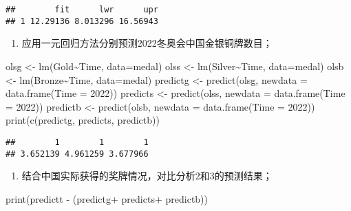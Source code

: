 \documentclass[
]{article}
\newenvironment{Shaded}{\begin{snugshade}}{\end{snugshade}}
\newcommand{\AttributeTok}[1]{\textcolor[rgb]{0.77,0.63,0.00}{#1}}
\newcommand{\DecValTok}[1]{\textcolor[rgb]{0.00,0.00,0.81}{#1}}
\newcommand{\FunctionTok}[1]{\textcolor[rgb]{0.00,0.00,0.00}{#1}}
\newcommand{\NormalTok}[1]{#1}
\newcommand{\OtherTok}[1]{\textcolor[rgb]{0.56,0.35,0.01}{#1}}
\newcommand{\SpecialCharTok}[1]{\textcolor[rgb]{0.00,0.00,0.00}{#1}}
\providecommand{\tightlist}{%
  \setlength{\itemsep}{0pt}\setlength{\parskip}{0pt}}
\begin{document}
\begin{verbatim}
##        fit      lwr      upr
## 1 12.29136 8.013296 16.56943
\end{verbatim}

\begin{enumerate}
\def\labelenumi{\arabic{enumi}.}
\setcounter{enumi}{2}
\tightlist
\item
  应用一元回归方法分别预测2022冬奥会中国金银铜牌数目；
\end{enumerate}

\begin{Shaded}
\begin{Highlighting}[]
\NormalTok{olsg }\OtherTok{\textless{}{-}} \FunctionTok{lm}\NormalTok{(Gold}\SpecialCharTok{\textasciitilde{}}\NormalTok{Time, }\AttributeTok{data=}\NormalTok{medal)}
\NormalTok{olss }\OtherTok{\textless{}{-}} \FunctionTok{lm}\NormalTok{(Silver}\SpecialCharTok{\textasciitilde{}}\NormalTok{Time, }\AttributeTok{data=}\NormalTok{medal)}
\NormalTok{olsb }\OtherTok{\textless{}{-}} \FunctionTok{lm}\NormalTok{(Bronze}\SpecialCharTok{\textasciitilde{}}\NormalTok{Time, }\AttributeTok{data=}\NormalTok{medal)}
\NormalTok{predictg }\OtherTok{\textless{}{-}} \FunctionTok{predict}\NormalTok{(olsg, }\AttributeTok{newdata =} \FunctionTok{data.frame}\NormalTok{(}\AttributeTok{Time =} \DecValTok{2022}\NormalTok{))}
\NormalTok{predicts }\OtherTok{\textless{}{-}} \FunctionTok{predict}\NormalTok{(olss, }\AttributeTok{newdata =} \FunctionTok{data.frame}\NormalTok{(}\AttributeTok{Time =} \DecValTok{2022}\NormalTok{))}
\NormalTok{predictb }\OtherTok{\textless{}{-}} \FunctionTok{predict}\NormalTok{(olsb, }\AttributeTok{newdata =} \FunctionTok{data.frame}\NormalTok{(}\AttributeTok{Time =} \DecValTok{2022}\NormalTok{))}
\FunctionTok{print}\NormalTok{(}\FunctionTok{c}\NormalTok{(predictg, predicts, predictb))}
\end{Highlighting}
\end{Shaded}

\begin{verbatim}
##        1        1        1 
## 3.652139 4.961259 3.677966
\end{verbatim}

\begin{enumerate}
\def\labelenumi{\arabic{enumi}.}
\setcounter{enumi}{3}
\tightlist
\item
  结合中国实际获得的奖牌情况，对比分析2和3的预测结果；
\end{enumerate}

\begin{Shaded}
\begin{Highlighting}[]
\FunctionTok{print}\NormalTok{(predictt }\SpecialCharTok{{-}}\NormalTok{ (predictg}\SpecialCharTok{+}\NormalTok{ predicts}\SpecialCharTok{+}\NormalTok{ predictb))}
\end{Highlighting}
\end{Shaded}
\end{document}
